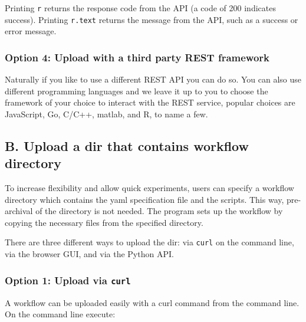 Printing \texttt{r} returns the response code from the API (a code of
200 indicates success). Printing \texttt{r.text} returns the message
from the API, such as a success or error message.

\hypertarget{option-4-upload-with-a-third-party-rest-framework}{%
\subsubsection{Option 4: Upload with a third party REST
framework}\label{option-4-upload-with-a-third-party-rest-framework}}

Naturally if you like to use a different REST API you can do so. You can
also use different programming languages and we leave it up to you to
choose the framework of your choice to interact with the REST service,
popular choices are JavaScript, Go, C/C++, matlab, and R, to name a few.

\hypertarget{b.-upload-a-dir-that-contains-workflow-directory}{%
\subsection{B. Upload a dir that contains workflow
directory}\label{b.-upload-a-dir-that-contains-workflow-directory}}

To increase flexibility and allow quick experiments, users can specify a
workflow directory which contains the yaml specification file and the
scripts. This way, pre-archival of the directory is not needed. The
program sets up the workflow by copying the necessary files from the
specified directory.

There are three different ways to upload the dir: via \texttt{curl} on
the command line, via the browser GUI, and via the Python API.

\hypertarget{option-1-upload-via-curl-1}{%
\subsubsection{\texorpdfstring{Option 1: Upload via
\texttt{curl}}{Option 1: Upload via curl}}\label{option-1-upload-via-curl-1}}

A workflow can be uploaded easily with a curl command from the command
line. On the command line execute:

\begin{Shaded}
\begin{Highlighting}[]
   \DataTypeTok{\textbackslash{}}
   \DataTypeTok{\textbackslash{}}
    \DataTypeTok{\textbackslash{}}
   \StringTok{\textquotesingle{}\textquotesingle{}}
\end{Highlighting}
\end{Shaded}

